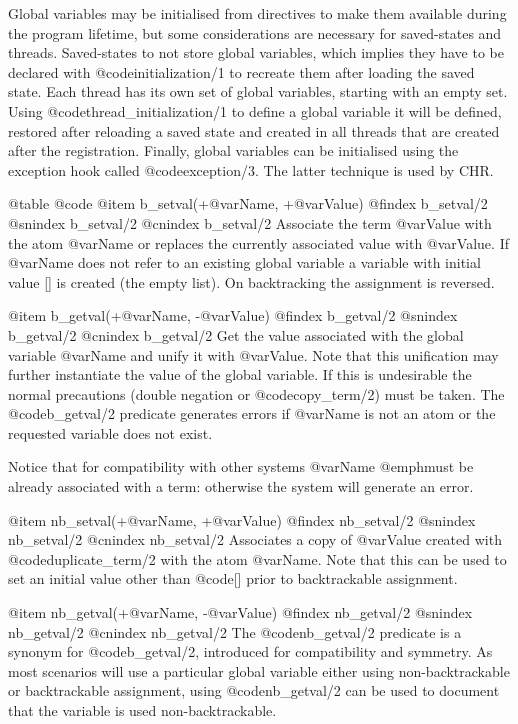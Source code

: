 {{{{{{Global variables may be initialised from directives to make them
available during the program lifetime, but some considerations are
necessary for saved-states and threads. Saved-states to not store
global variables, which implies they have to be declared with
@code{initialization/1} to recreate them after loading the saved
state. Each thread has its own set of global variables, starting with
an empty set. Using @code{thread_initialization/1} to define a global
variable it will be defined, restored after reloading a saved state
and created in all threads that are created after the
registration. Finally, global variables can be initialised using the
exception hook called @code{exception/3}. The latter technique is used
by CHR.

@table @code
@item b_setval(+@var{Name}, +@var{Value}) 
@findex b_setval/2
@snindex b_setval/2
@cnindex b_setval/2
Associate the term @var{Value} with the atom @var{Name} or replaces
the currently associated value with @var{Value}. If @var{Name} does
not refer to an existing global variable a variable with initial value
[] is created (the empty list). On backtracking the assignment is
reversed. 

@item b_getval(+@var{Name}, -@var{Value}) 
@findex b_getval/2
@snindex b_getval/2
@cnindex b_getval/2
Get the value associated with the global variable @var{Name} and unify
it with @var{Value}. Note that this unification may further
instantiate the value of the global variable. If this is undesirable
the normal precautions (double negation or @code{copy_term/2}) must be
taken. The @code{b_getval/2} predicate generates errors if @var{Name} is not
an atom or the requested variable does not exist. 

Notice that for compatibility with other systems @var{Name} @emph{must} be already associated with a term: otherwise the system will generate an error.

@item nb_setval(+@var{Name}, +@var{Value}) 
@findex nb_setval/2
@snindex nb_setval/2
@cnindex nb_setval/2
Associates a copy of @var{Value} created with @code{duplicate_term/2} with
the atom @var{Name}. Note that this can be used to set an initial
value other than @code{[]} prior to backtrackable assignment.

@item nb_getval(+@var{Name}, -@var{Value}) 
@findex nb_getval/2
@snindex nb_getval/2
@cnindex nb_getval/2
The @code{nb_getval/2} predicate is a synonym for @code{b_getval/2},
introduced for compatibility and symmetry. As most scenarios will use
a particular global variable either using non-backtrackable or
backtrackable assignment, using @code{nb_getval/2} can be used to
document that the variable is used non-backtrackable.

}}}}}}
